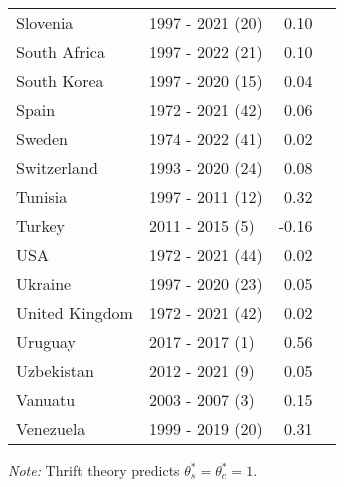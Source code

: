 \begin{table}[H]
{{\begin{tabular}{llrr}
Slovenia & 1997 - 2021 (20) & 0.10\\
South Africa & 1997 - 2022 (21) & 0.10\\
South Korea & 1997 - 2020 (15) & 0.04\\
Spain & 1972 - 2021 (42) & 0.06\\
\addlinespace
Sweden & 1974 - 2022 (41) & 0.02\\
Switzerland & 1993 - 2020 (24) & 0.08\\
Tunisia & 1997 - 2011 (12) & 0.32\\
Turkey & 2011 - 2015 (5) & -0.16\\
USA & 1972 - 2021 (44) & 0.02\\
\addlinespace
Ukraine & 1997 - 2020 (23) & 0.05\\
United Kingdom & 1972 - 2021 (42) & 0.02\\
Uruguay & 2017 - 2017 (1) & 0.56\\
Uzbekistan & 2012 - 2021 (9) & 0.05\\
Vanuatu & 2003 - 2007 (3) & 0.15\\
\addlinespace
Venezuela & 1999 - 2019 (20) & 0.31\\
\bottomrule
\end{tabular}

}

}


\label{tbl-indicator_table}
\begin{flushleft}
\footnotesize \emph{Note:} Thrift theory predicts \(\theta_s^* = \theta_c^* = 1\).
\end{flushleft}
\end{table}